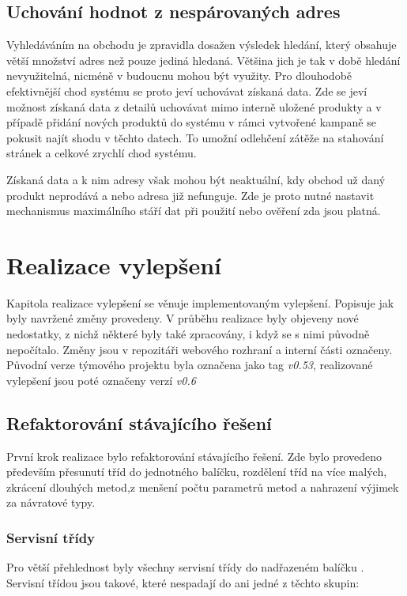 \documentclass[thesis=B,czech]{FITthesis}[2012/06/26]
\begin{document}
\section{Uchování hodnot z nespárovaných adres}
Vyhledáváním na obchodu je zpravidla dosažen výsledek hledání, který obsahuje větší množství adres než pouze
jediná hledaná. Většina jich je tak v době hledání nevyužitelná, nicméně v budoucnu mohou být využity. Pro dlouhodobě 
efektivnější chod systému se proto jeví uchovávat získaná data. Zde se jeví možnost získaná data z detailů uchovávat mimo interně uložené produkty
a v případě přidání nových produktů do systému v rámci vytvořené kampaně se pokusit najít shodu v těchto datech. To umožní odlehčení zátěže
na stahování stránek a celkové zrychlí chod systému.
\par
Získaná data a k nim adresy však mohou být neaktuální, kdy obchod už daný produkt neprodává a nebo adresa již nefunguje. Zde je proto nutné
nastavit mechanismus maximálního stáří dat při použití nebo ověření zda jsou platná.


\chapter{Realizace vylepšení}
Kapitola realizace vylepšení se věnuje implementovaným vylepšení. Popisuje jak byly navržené změny provedeny.
V průběhu realizace byly objeveny nové nedostatky, z nichž některé byly také zpracovány, i když se s nimi původně nepočítalo.
Změny jsou v repozitáři webového rozhraní a interní části označeny. Původní verze týmového projektu byla označena jako
tag \textit{v0.53}, realizované vylepšení jsou poté označeny verzí \textit{v0.6}

\section{Refaktorování stávajícího řešení}
První krok realizace bylo refaktorování stávajícího řešení. Zde bylo provedeno především přesunutí tříd do jednotného balíčku, 
rozdělení tříd na více malých, zkrácení dlouhých metod,z menšení počtu parametrů metod a nahrazení výjimek za návratové typy.

\subsection{Servisní třídy}
Pro větší přehlednost byly všechny servisní třídy do nadřazeném balíčku . 
Servisní třídou jsou takové, které nespadají do ani jedné z těchto skupin:
\end{document}
